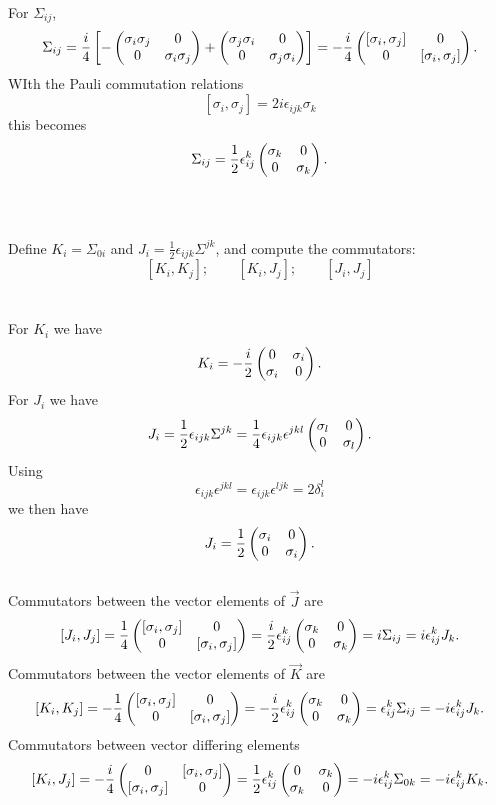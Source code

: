 \documentclass[10pt,letterpaper]{article}
\begin{document}
	For $\Sigma_{ij}$, 
	\[
		\Sigma_{ij} = \frac{i}{4}\left[ - \begin{pmatrix} \sigma_i\sigma_j & 0\\ 0 & \sigma_i\sigma_j \end{pmatrix}
		+
		 \begin{pmatrix} \sigma_j\sigma_i & 0\\ 0 & \sigma_j\sigma_i \end{pmatrix}\right]
		 = -\frac{i}{4}\begin{pmatrix} [\sigma_i,\sigma_j] &0 \\ 0 & [\sigma_i,\sigma_j] \end{pmatrix}. 
	\]
	WIth the Pauli commutation relations
	\[
		[\sigma_i,\sigma_j] = 2i\epsilon_{ijk}\sigma_k
	\]
	this becomes
	\[
		\Sigma_{ij} = \frac{1}{2}\epsilon_{ij}^k \begin{pmatrix} \sigma_k & 0 \\ 0 & \sigma_k \end{pmatrix}.
	\]
	\\ \\
	\item
	Define $K_i = \Sigma_{0i}$ and $J_i = \frac{1}{2}\epsilon_{ijk}\Sigma^{jk}$, and compute the commutators:
	\[
		[K_i,K_j];\qquad [K_i,J_j];\qquad [J_i,J_j]
	\]
	\\ \\
	For $K_i$ we have
	\[
		K_i = -\frac{i}{2}\begin{pmatrix} 0 & \sigma_i \\ \sigma_i &0 \end{pmatrix}.
	\]
	For $J_i$ we have
	\[
		J_i = \frac{1}{2}\epsilon_{ijk}\Sigma^{jk} = \frac{1}{4}\epsilon_{ijk}\epsilon^{jkl}\begin{pmatrix}
		\sigma_l & 0 \\ 0 & \sigma_l \end{pmatrix}.
	\]
	Using
	\[
		\epsilon_{ijk}\epsilon^{jkl} = \epsilon_{ijk}\epsilon^{ljk} = 2\delta_i^l 
	\]
	we then have
	\[
		J_i = \frac{1}{2}\begin{pmatrix} \sigma_i & 0 \\ 0 & \sigma_i \end{pmatrix}.
	\]
	\\
	Commutators between the vector elements of $\vec J$ are
	\[
		[J_i,J_j] = \frac{1}{4}\begin{pmatrix} [\sigma_i,\sigma_j] & 0 \\ 0 & [\sigma_i,\sigma_j] \end{pmatrix} = 
		\frac{i}{2}\epsilon_{ij}^k \begin{pmatrix} \sigma_k & 0\\ 0 & \sigma_k \end{pmatrix} =i \Sigma_{ij}
		= i\epsilon_{ij}^kJ_k.
	\]
	Commutators between the vector elements of $\vec K$ are 
	\[
		[K_i,K_j] = -\frac{1}{4}\begin{pmatrix} [\sigma_i,\sigma_j]&0  \\  0&[\sigma_i,\sigma_j] \end{pmatrix} = 
		-\frac{i}{2}\epsilon_{ij}^k \begin{pmatrix} \sigma_k&0 \\  0&\sigma_k  \end{pmatrix} = \epsilon_{ij}^k\Sigma_{ij}
		= -i\epsilon_{ij}^kJ_k.
	\]
	Commutators between vector differing elements
	\[
		[K_i,J_j] = -\frac{i}{4}\begin{pmatrix} 0 & [\sigma_i,\sigma_j] \\ [\sigma_i,\sigma_j] & 0 \end{pmatrix}
		= \frac{1}{2} \epsilon_{ij}^k\begin{pmatrix} 0 & \sigma_k \\ \sigma_k & 0 \end{pmatrix} = -i\epsilon^k_{ij}\Sigma_{0k}
		= -i\epsilon_{ij}^kK_k.
	\]
\end{document}
